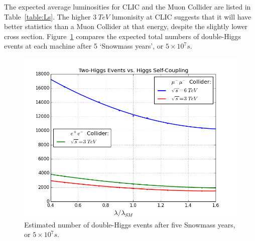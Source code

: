 \documentclass[12pt]{article}
\begin{document}
The expected average luminosities for CLIC and the Muon Collider are listed in Table~\ref{table:Ls}. The higher $3~TeV$ lumonisity at CLIC suggests that it will have better statistics than a Muon Collider at that energy, despite the slightly lower cross section. Figure~\ref{fig:num-higgs} compares the expected total numbers of double-Higgs events at each machine after 5 `Snowmass years', or $5\times10^7s$.

\begin{figure}
	\centering
	\includegraphics[width=\textwidth]{num_higgs}
	\caption{Estimated number of double-Higgs events after five Snowmass years, or $5\times10^7s$.}\label{fig:num-higgs}
\end{figure}



\end{document}
